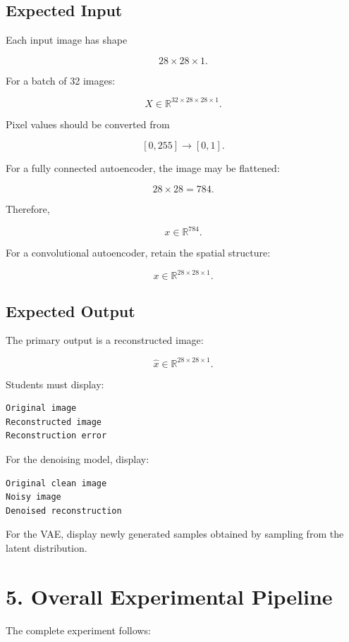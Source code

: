 \documentclass[10pt]{article}
\begin{document}
\subsection*{Expected Input}

Each input image has shape

\[
28\times28\times1.
\]

For a batch of 32 images:

\[
X\in\mathbb{R}^{32\times28\times28\times1}.
\]

Pixel values should be converted from

\[
[0,255]\rightarrow[0,1].
\]

For a fully connected autoencoder, the image may be flattened:

\[
28\times28=784.
\]

Therefore,

\[
x\in\mathbb{R}^{784}.
\]

For a convolutional autoencoder, retain the spatial structure:

\[
x\in\mathbb{R}^{28\times28\times1}.
\]

\subsection*{Expected Output}

The primary output is a reconstructed image:

\[
\hat{x}\in\mathbb{R}^{28\times28\times1}.
\]

Students must display:

\begin{verbatim}
Original image
Reconstructed image
Reconstruction error
\end{verbatim}

For the denoising model, display:

\begin{verbatim}
Original clean image
Noisy image
Denoised reconstruction
\end{verbatim}

For the VAE, display newly generated samples obtained by sampling from the
latent distribution.

\section*{5. Overall Experimental Pipeline}

The complete experiment follows:
\end{document}
